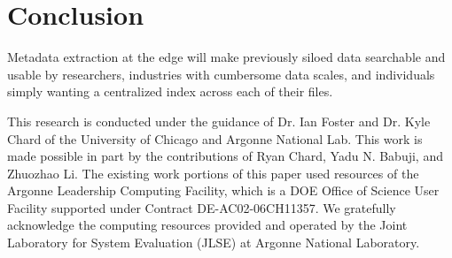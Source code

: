 \documentclass[sigconf]{acmart}
\begin{document}
\section{Conclusion}
\label{sec:conc}

Metadata extraction at the edge will make previously siloed data searchable and usable by researchers, 
industries with cumbersome data scales, and individuals simply wanting a centralized index across 
each of their files. 


\begin{acks}

This research is conducted under the guidance of Dr. Ian Foster and Dr. Kyle Chard of the 
University of Chicago and Argonne National Lab. This work is made possible in part by the contributions
of Ryan Chard, Yadu N. Babuji, and Zhuozhao Li. The existing work portions of this paper used resources of the
Argonne Leadership Computing Facility, which is a DOE Office of Science User
Facility supported under Contract DE-AC02-06CH11357. 
We gratefully acknowledge the computing resources provided and 
operated by the Joint Laboratory for System Evaluation (JLSE) at Argonne National Laboratory. 


\end{acks}


\end{document}
